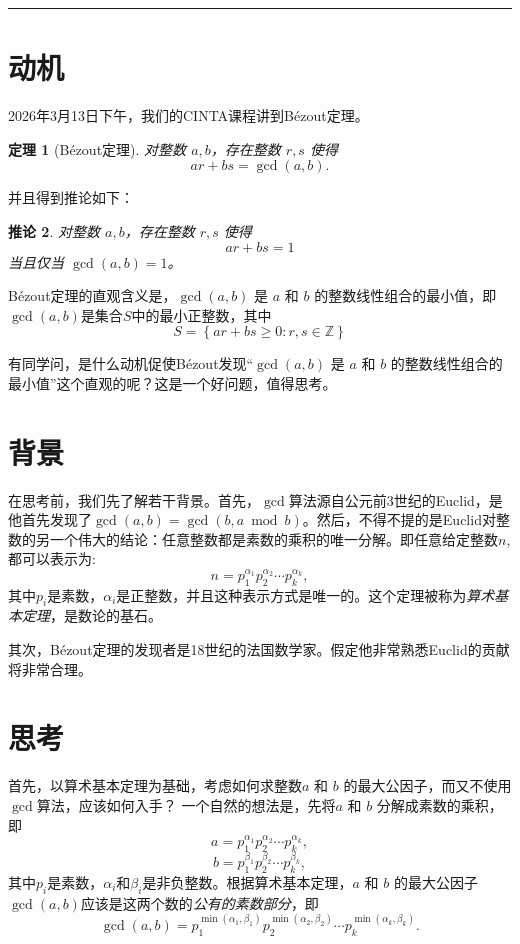\documentclass[12pt,a4paper]{ctexart}
\title{\vspace{-1.2cm}\textbf{\CourseTitle}}
\author{\AuthorName}
\date{\Term}
\theoremstyle{plain}
\newtheorem{theorem}{定理}[section]
\newtheorem{corollary}[theorem]{推论}
\theoremstyle{definition}
\theoremstyle{remark}
\newcommand{\Z}{\mathbb{Z}}
\newcommand{\set}[1]{\left\{ #1 \right\}}
\begin{document}
\maketitle
\tableofcontents
\vspace{0.8em}
\hrule
\vspace{1em}

\section{动机}
2026年3月13日下午，我们的CINTA课程讲到B\'ezout定理。
\begin{theorem}[B\'ezout定理]
\label{thm:bezout}
对整数 $a,b$，存在整数 $r,s$ 使得
\[ar+bs=\gcd(a,b).
\]\end{theorem}
并且得到推论如下：
\begin{corollary}
\label{cor:bezout}
对整数 $a,b$，存在整数 $r,s$ 使得
\[ar+bs=1
\]当且仅当 $\gcd(a,b)=1$。
\end{corollary}

B\'ezout定理的直观含义是，$\gcd(a,b)$ 是 $a$ 和 $b$ 的整数线性组合的最小值，即$\gcd(a,b)$是集合$S$中的最小正整数，其中
\[S = \set{ar+bs \geq 0: r,s\in\Z}\]

有同学问，是什么动机促使B\'ezout发现“$\gcd(a,b)$ 是 $a$ 和 $b$ 的整数线性组合的最小值”这个直观的呢？这是一个好问题，值得思考。

\section{背景}
在思考前，我们先了解若干背景。首先，$\gcd$算法源自公元前3世纪的Euclid，是他首先发现了$\gcd(a,b) = \gcd(b, a\bmod b)$。然后，不得不提的是Euclid对整数的另一个伟大的结论：任意整数都是素数的乘积的唯一分解。即任意给定整数$n$,都可以表示为:
\[n=p_1^{\alpha_1}p_2^{\alpha_2}\cdots p_k^{\alpha_k},\]其中$p_i$是素数，$\alpha_i$是正整数，并且这种表示方式是唯一的。这个定理被称为\emph{算术基本定理}，是数论的基石。

其次，B\'ezout定理的发现者是18世纪的法国数学家。假定他非常熟悉Euclid的贡献将非常合理。

\section{思考}
首先，以算术基本定理为基础，考虑如何求整数$a$ 和 $b$ 的最大公因子，而又不使用$\gcd$算法，应该如何入手？
一个自然的想法是，先将$a$ 和 $b$ 分解成素数的乘积，即
\[a=p_1^{\alpha_1}p_2^{\alpha_2}\cdots p_k^{\alpha_k},\]
\[b=p_1^{\beta_1}p_2^{\beta_2}\cdots p_k^{\beta_k},\]其中$p_i$是素数，$\alpha_i$和$\beta_i$是非负整数。根据算术基本定理，$a$ 和 $b$ 的最大公因子$\gcd(a,b)$应该是这两个数的\emph{公有的素数部分}，即
\[\gcd(a,b)=p_1^{\min(\alpha_1,\beta_1)}p_2^{\min(\alpha_2,\beta_2)}\cdots p_k^{\min(\alpha_k,\beta_k)}.\]
\end{document}
